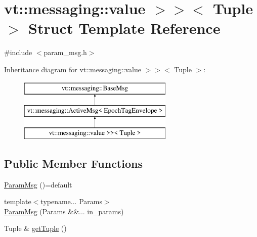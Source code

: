 \hypertarget{structvt_1_1messaging_1_1_param_msg_3_01_tuple_00_01std_1_1enable__if__t_3_01is__byte__copyable_50e4a53750896883a846627550850f59}{}\section{vt\+:\+:messaging\+:\+:value $>$$>$$<$ Tuple $>$ Struct Template Reference}
\label{structvt_1_1messaging_1_1_param_msg_3_01_tuple_00_01std_1_1enable__if__t_3_01is__byte__copyable_50e4a53750896883a846627550850f59}


{\ttfamily \#include $<$param\+\_\+msg.\+h$>$}

Inheritance diagram for vt\+:\+:messaging\+:\+:value $>$$>$$<$ Tuple $>$\+:\begin{figure}[H]
\begin{center}
\leavevmode
\includegraphics[height=3.000000cm]{structvt_1_1messaging_1_1_param_msg_3_01_tuple_00_01std_1_1enable__if__t_3_01is__byte__copyable_50e4a53750896883a846627550850f59}
\end{center}
\end{figure}
\subsection*{Public Member Functions}
\begin{DoxyCompactItemize}
\item 
\hyperlink{structvt_1_1messaging_1_1_param_msg_3_01_tuple_00_01std_1_1enable__if__t_3_01is__byte__copyable_50e4a53750896883a846627550850f59_ab09a04140f07bf5b72c6f82cbcae8f9b}{Param\+Msg} ()=default
\item 
{\footnotesize template$<$typename... Params$>$ }\\\hyperlink{structvt_1_1messaging_1_1_param_msg_3_01_tuple_00_01std_1_1enable__if__t_3_01is__byte__copyable_50e4a53750896883a846627550850f59_abcda072cf1e80d5687212b1c59d7c253}{Param\+Msg} (Params \&\&... in\+\_\+params)
\item 
Tuple \& \hyperlink{structvt_1_1messaging_1_1_param_msg_3_01_tuple_00_01std_1_1enable__if__t_3_01is__byte__copyable_50e4a53750896883a846627550850f59_ad68e4bf3b45364439d5c7c8d38499a53}{get\+Tuple} ()
\end{DoxyCompactItemize}
